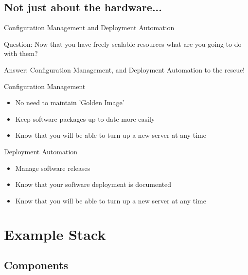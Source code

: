 \documentclass{beamer}
\begin{document}
\subsection{Not just about the hardware...}
\begin{frame}{Configuration Management and Deployment Automation}
  \begin{block}{Question:}
    Now that you have freely scalable resources what are you going to do with them?
  \end{block}
  \begin{block}{Answer:}
    Configuration Management, and Deployment Automation to the rescue!
  \end{block}
\end{frame}

\begin{frame}{Configuration Management}
  \begin{itemize}
  \item No need to maintain 'Golden Image'
  \item Keep software packages up to date more easily
  \item Know that you will be able to turn up a new server at any time
  \end{itemize}
\end{frame}

\begin{frame}{Deployment Automation}
  \begin{itemize}
  \item Manage software releases
  \item Know that your software deployment is documented
  \item Know that you will be able to turn up a new server at any time
  \end{itemize}
\end{frame}

\section{Example Stack}

\subsection{Components}
\end{document}
